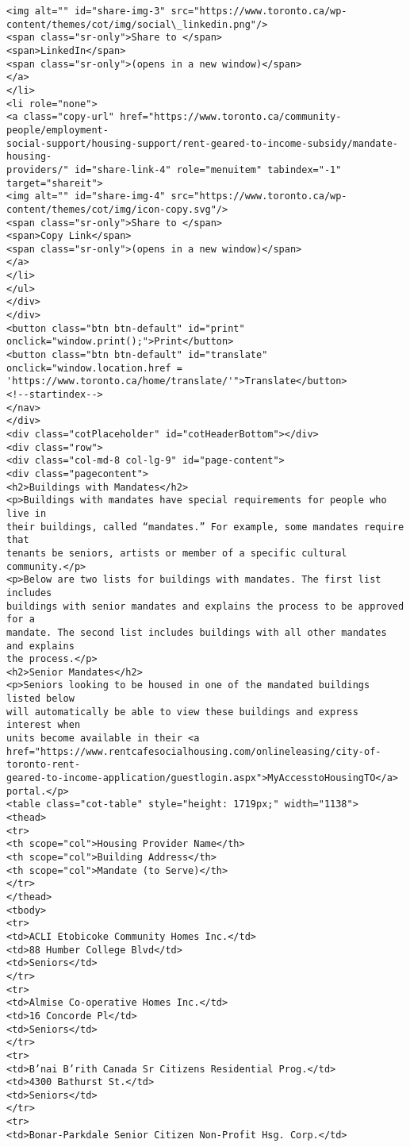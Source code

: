 \documentclass[11pt]{article}
\begin{document}
\begin{Verbatim}[commandchars=\\\{\}]
<img alt="" id="share-img-3" src="https://www.toronto.ca/wp-
content/themes/cot/img/social\_linkedin.png"/>
<span class="sr-only">Share to </span>
<span>LinkedIn</span>
<span class="sr-only">(opens in a new window)</span>
</a>
</li>
<li role="none">
<a class="copy-url" href="https://www.toronto.ca/community-people/employment-
social-support/housing-support/rent-geared-to-income-subsidy/mandate-housing-
providers/" id="share-link-4" role="menuitem" tabindex="-1" target="shareit">
<img alt="" id="share-img-4" src="https://www.toronto.ca/wp-
content/themes/cot/img/icon-copy.svg"/>
<span class="sr-only">Share to </span>
<span>Copy Link</span>
<span class="sr-only">(opens in a new window)</span>
</a>
</li>
</ul>
</div>
</div>
<button class="btn btn-default" id="print"
onclick="window.print();">Print</button>
<button class="btn btn-default" id="translate" onclick="window.location.href =
'https://www.toronto.ca/home/translate/'">Translate</button>
<!--startindex-->
</nav>
</div>
<div class="cotPlaceholder" id="cotHeaderBottom"></div>
<div class="row">
<div class="col-md-8 col-lg-9" id="page-content">
<div class="pagecontent">
<h2>Buildings with Mandates</h2>
<p>Buildings with mandates have special requirements for people who live in
their buildings, called “mandates.” For example, some mandates require that
tenants be seniors, artists or member of a specific cultural community.</p>
<p>Below are two lists for buildings with mandates. The first list includes
buildings with senior mandates and explains the process to be approved for a
mandate. The second list includes buildings with all other mandates and explains
the process.</p>
<h2>Senior Mandates</h2>
<p>Seniors looking to be housed in one of the mandated buildings listed below
will automatically be able to view these buildings and express interest when
units become available in their <a
href="https://www.rentcafesocialhousing.com/onlineleasing/city-of-toronto-rent-
geared-to-income-application/guestlogin.aspx">MyAccesstoHousingTO</a>
portal.</p>
<table class="cot-table" style="height: 1719px;" width="1138">
<thead>
<tr>
<th scope="col">Housing Provider Name</th>
<th scope="col">Building Address</th>
<th scope="col">Mandate (to Serve)</th>
</tr>
</thead>
<tbody>
<tr>
<td>ACLI Etobicoke Community Homes Inc.</td>
<td>88 Humber College Blvd</td>
<td>Seniors</td>
</tr>
<tr>
<td>Almise Co-operative Homes Inc.</td>
<td>16 Concorde Pl</td>
<td>Seniors</td>
</tr>
<tr>
<td>B’nai B’rith Canada Sr Citizens Residential Prog.</td>
<td>4300 Bathurst St.</td>
<td>Seniors</td>
</tr>
<tr>
<td>Bonar-Parkdale Senior Citizen Non-Profit Hsg. Corp.</td>

\end{Verbatim}
\end{document}
